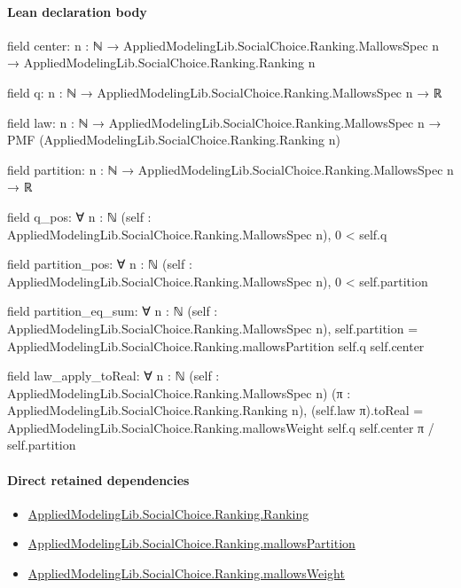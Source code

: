 \documentclass[10pt]{article}
\begin{document}
\paragraph{Lean declaration body}
\begin{ReviewVerbatim}
field center:
{n : ℕ} → AppliedModelingLib.SocialChoice.Ranking.MallowsSpec n → AppliedModelingLib.SocialChoice.Ranking.Ranking n

field q:
{n : ℕ} → AppliedModelingLib.SocialChoice.Ranking.MallowsSpec n → ℝ

field law:
{n : ℕ} →
  AppliedModelingLib.SocialChoice.Ranking.MallowsSpec n → PMF (AppliedModelingLib.SocialChoice.Ranking.Ranking n)

field partition:
{n : ℕ} → AppliedModelingLib.SocialChoice.Ranking.MallowsSpec n → ℝ

field q_pos:
∀ {n : ℕ} (self : AppliedModelingLib.SocialChoice.Ranking.MallowsSpec n), 0 < self.q

field partition_pos:
∀ {n : ℕ} (self : AppliedModelingLib.SocialChoice.Ranking.MallowsSpec n), 0 < self.partition

field partition_eq_sum:
∀ {n : ℕ} (self : AppliedModelingLib.SocialChoice.Ranking.MallowsSpec n),
  self.partition = AppliedModelingLib.SocialChoice.Ranking.mallowsPartition self.q self.center

field law_apply_toReal:
∀ {n : ℕ} (self : AppliedModelingLib.SocialChoice.Ranking.MallowsSpec n)
  (π : AppliedModelingLib.SocialChoice.Ranking.Ranking n),
  (self.law π).toReal = AppliedModelingLib.SocialChoice.Ranking.mallowsWeight self.q self.center π / self.partition
\end{ReviewVerbatim}

\paragraph{Direct retained dependencies}
\begin{itemize}\raggedright
\item \hyperlink{governing-declaration-5cde54446d1ae021}{Applied\allowbreak{}Modeling\allowbreak{}Lib.\allowbreak{}Social\allowbreak{}Choice.\allowbreak{}Ranking.\allowbreak{}Ranking}
\item \hyperlink{governing-declaration-8f2d5c2579298760}{Applied\allowbreak{}Modeling\allowbreak{}Lib.\allowbreak{}Social\allowbreak{}Choice.\allowbreak{}Ranking.\allowbreak{}mallows\allowbreak{}Partition}
\item \hyperlink{governing-declaration-cf0a31090cb2e13b}{Applied\allowbreak{}Modeling\allowbreak{}Lib.\allowbreak{}Social\allowbreak{}Choice.\allowbreak{}Ranking.\allowbreak{}mallows\allowbreak{}Weight}
\end{itemize}
\hypertarget{governing-declaration-d8624d13262ed446}{}
\end{document}
